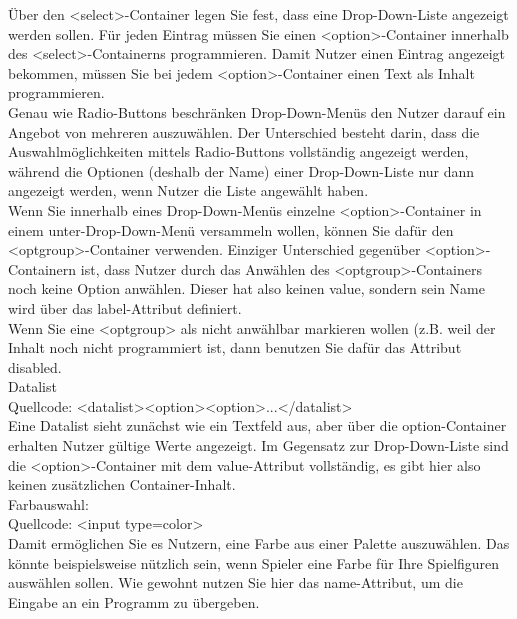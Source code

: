 Über den <select>-Container legen Sie fest, dass eine Drop-Down-Liste angezeigt werden sollen. Für jeden Eintrag müssen Sie einen <option>-Container innerhalb des <select>-Containerns programmieren. Damit Nutzer einen Eintrag angezeigt bekommen, müssen Sie bei jedem <option>-Container einen Text als Inhalt programmieren.\\

Genau wie Radio-Buttons beschränken Drop-Down-Menüs den Nutzer darauf ein Angebot von mehreren auszuwählen. Der Unterschied besteht darin, dass die Auswahlmöglichkeiten mittels Radio-Buttons vollständig angezeigt werden, während die Optionen (deshalb der Name) einer Drop-Down-Liste nur dann angezeigt werden, wenn Nutzer die Liste angewählt haben.\\

Wenn Sie innerhalb eines Drop-Down-Menüs einzelne <option>-Container in einem unter-Drop-Down-Menü versammeln wollen, können Sie dafür den <optgroup>-Container verwenden. Einziger Unterschied gegenüber <option>-Containern ist, dass Nutzer durch das Anwählen des <optgroup>-Containers noch keine Option anwählen. Dieser hat also keinen value, sondern sein Name wird über das label-Attribut definiert.\\

Wenn Sie eine <optgroup> als nicht anwählbar markieren wollen (z.B. weil der Inhalt noch nicht programmiert ist, dann benutzen Sie dafür das Attribut disabled.\\

Datalist\\

Quellcode: <datalist><option><option>...</datalist>\\

Eine Datalist sieht zunächst wie ein Textfeld aus, aber über die option-Container erhalten Nutzer gültige Werte angezeigt. Im Gegensatz zur Drop-Down-Liste sind die <option>-Container mit dem value-Attribut vollständig, es gibt hier also keinen zusätzlichen Container-Inhalt.\\

Farbauswahl:\\

Quellcode: <input type=color>\\

Damit ermöglichen Sie es Nutzern, eine Farbe aus einer Palette auszuwählen. Das könnte beispielsweise nützlich sein, wenn Spieler eine Farbe für Ihre Spielfiguren auswählen sollen. Wie gewohnt nutzen Sie hier das name-Attribut, um die Eingabe an ein Programm zu übergeben. 

